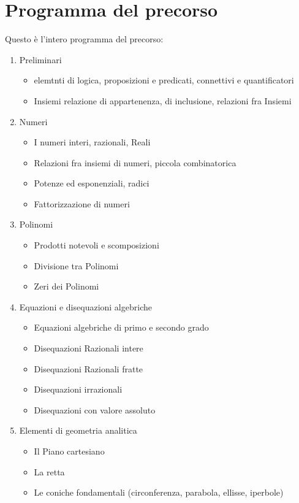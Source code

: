 \documentclass[12pt, a4paper, openany]{book}
\begin{document}
\section{Programma del precorso}
Questo è l'intero programma del precorso:
\begin{enumerate}
    \item Preliminari
    \begin{itemize}
        \item elemtnti di logica, proposizioni e predicati, connettivi e quantificatori
        \item Insiemi relazione di appartenenza, di inclusione, relazioni fra Insiemi
    \end{itemize}
    \item Numeri
    \begin{itemize}
        \item I numeri interi, razionali, Reali
        \item Relazioni fra insiemi di numeri, piccola combinatorica
        \item Potenze ed esponenziali, radici
        \item Fattorizzazione di numeri
    \end{itemize}
    \item Polinomi
    \begin{itemize}
        \item Prodotti notevoli e scomposizioni
        \item Divisione tra Polinomi
        \item Zeri dei Polinomi
    \end{itemize}
    \item Equazioni e disequazioni algebriche
    \begin{itemize}
        \item Equazioni algebriche di primo e secondo grado
        \item Disequazioni Razionali intere
        \item Disequazioni Razionali fratte
        \item Disequazioni irrazionali
        \item Disequazioni con valore assoluto
    \end{itemize}
    \item Elementi di geometria analitica
    \begin{itemize}
        \item Il Piano cartesiano
        \item La retta
        \item Le coniche fondamentali (circonferenza, parabola, ellisse, iperbole)

\end{itemize}
\end{enumerate}
\end{document}
